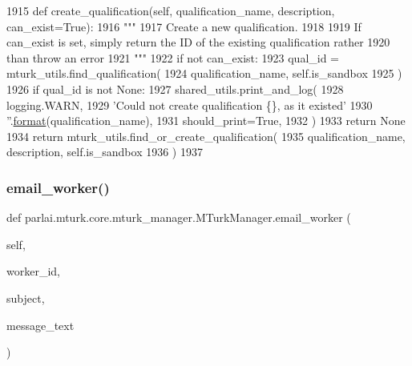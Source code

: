 \begin{DoxyCode}
1915     \textcolor{keyword}{def }create\_qualification(self, qualification\_name, description, can\_exist=True):
1916         \textcolor{stringliteral}{"""}
1917 \textcolor{stringliteral}{        Create a new qualification.}
1918 \textcolor{stringliteral}{}
1919 \textcolor{stringliteral}{        If can\_exist is set, simply return the ID of the existing qualification rather}
1920 \textcolor{stringliteral}{        than throw an error}
1921 \textcolor{stringliteral}{        """}
1922         \textcolor{keywordflow}{if} \textcolor{keywordflow}{not} can\_exist:
1923             qual\_id = mturk\_utils.find\_qualification(
1924                 qualification\_name, self.is\_sandbox
1925             )
1926             \textcolor{keywordflow}{if} qual\_id \textcolor{keywordflow}{is} \textcolor{keywordflow}{not} \textcolor{keywordtype}{None}:
1927                 shared\_utils.print\_and\_log(
1928                     logging.WARN,
1929                     \textcolor{stringliteral}{'Could not create qualification \{\}, as it existed'}
1930                     \textcolor{stringliteral}{''}.\hyperlink{namespaceparlai_1_1chat__service_1_1services_1_1messenger_1_1shared__utils_a32e2e2022b824fbaf80c747160b52a76}{format}(qualification\_name),
1931                     should\_print=\textcolor{keyword}{True},
1932                 )
1933                 \textcolor{keywordflow}{return} \textcolor{keywordtype}{None}
1934         \textcolor{keywordflow}{return} mturk\_utils.find\_or\_create\_qualification(
1935             qualification\_name, description, self.is\_sandbox
1936         )
1937 
\end{DoxyCode}
\mbox{\label{classparlai_1_1mturk_1_1core_1_1mturk__manager_1_1MTurkManager_afd2e53ad36f1975af45cc64c0940a41f}} 
\subsubsection{\texorpdfstring{email\+\_\+worker()}{email\_worker()}}
{\footnotesize\ttfamily def parlai.\+mturk.\+core.\+mturk\+\_\+manager.\+M\+Turk\+Manager.\+email\+\_\+worker (\begin{DoxyParamCaption}\item[{}]{self,  }\item[{}]{worker\+\_\+id,  }\item[{}]{subject,  }\item[{}]{message\+\_\+text }\end{DoxyParamCaption})}

